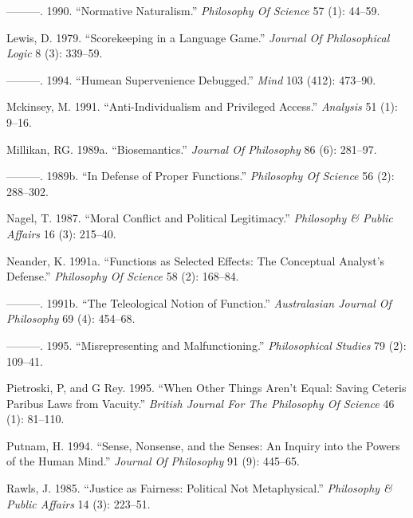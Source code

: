 \documentclass[
  10pt,
  letterpaper,
  DIV=11,
  numbers=noendperiod,
  twoside]{scrartcl}
\newlength{\cslhangindent}
\newenvironment{CSLReferences}[2] %
 {\begin{list}{}{%
  \setlength{\itemindent}{0pt}
  \setlength{\leftmargin}{0pt}
  \setlength{\parsep}{0pt}
  \ifodd #1
   \setlength{\leftmargin}{\cslhangindent}
   \setlength{\itemindent}{-1\cslhangindent}
  \fi
  \setlength{\itemsep}{#2\baselineskip}}}
 {\end{list}}
\begin{document}
\begin{CSLReferences}{1}{0}
---------. 1990. {``Normative Naturalism.''} \emph{Philosophy Of
Science} 57 (1): 44--59.

Lewis, D. 1979. {``Scorekeeping in a Language Game.''} \emph{Journal Of
Philosophical Logic} 8 (3): 339--59.

---------. 1994. {``Humean Supervenience Debugged.''} \emph{Mind} 103
(412): 473--90.

Mckinsey, M. 1991. {``Anti-Individualism and Privileged Access.''}
\emph{Analysis} 51 (1): 9--16.

Millikan, RG. 1989a. {``Biosemantics.''} \emph{Journal Of Philosophy} 86
(6): 281--97.

---------. 1989b. {``In Defense of Proper Functions.''} \emph{Philosophy
Of Science} 56 (2): 288--302.

Nagel, T. 1987. {``Moral Conflict and Political Legitimacy.''}
\emph{Philosophy \& Public Affairs} 16 (3): 215--40.

Neander, K. 1991a. {``Functions as Selected Effects: The Conceptual
Analyst's Defense.''} \emph{Philosophy Of Science} 58 (2): 168--84.

---------. 1991b. {``The Teleological Notion of Function.''}
\emph{Australasian Journal Of Philosophy} 69 (4): 454--68.

---------. 1995. {``Misrepresenting and Malfunctioning.''}
\emph{Philosophical Studies} 79 (2): 109--41.

Pietroski, P, and G Rey. 1995. {``When Other Things Aren't Equal: Saving
Ceteris Paribus Laws from Vacuity.''} \emph{British Journal For The
Philosophy Of Science} 46 (1): 81--110.

Putnam, H. 1994. {``Sense, Nonsense, and the Senses: An Inquiry into the
Powers of the Human Mind.''} \emph{Journal Of Philosophy} 91 (9):
445--65.

Rawls, J. 1985. {``Justice as Fairness: Political Not Metaphysical.''}
\emph{Philosophy \& Public Affairs} 14 (3): 223--51.


\end{CSLReferences}
\end{document}
